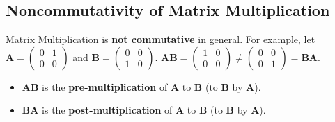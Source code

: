 \documentclass[../ma2001_notes.tex]{subfiles}
\begin{document}
\subsection{Noncommutativity of Matrix Multiplication}
Matrix Multiplication is \textbf{not commutative} in general. For example, let \(\bm{A}=\begin{pmatrix}
	0 & 1 \\ 0 & 0
\end{pmatrix}\) and \(\bm{B}=\begin{pmatrix}
	0 & 0 \\ 1 & 0
\end{pmatrix}\). \(\bm{AB}=\begin{pmatrix}
	1 & 0 \\ 0 & 0
\end{pmatrix}\ne\begin{pmatrix}
	0 & 0 \\ 0 & 1
\end{pmatrix}=\bm{BA}\).
\begin{itemize}
	\item\(\bm{A}\bm{B}\) is the \textbf{pre-multiplication} of \(\bm{A}\) to \(\bm{B}\) (to \(\bm{B}\) by \(\bm{A}\)).
	\item\(\bm{B}\bm{A}\) is the \textbf{post-multiplication} of \(\bm{A}\) to \(\bm{B}\) (to \(\bm{B}\) by \(\bm{A}\)).
\end{itemize}
\end{document}
